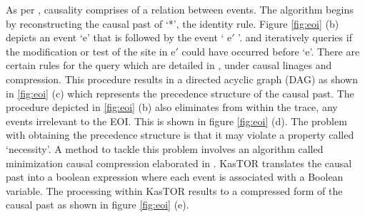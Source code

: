 \documentclass[msc,deptreport,ai]{infthesis}      %
\begin{document}
As per \cite{kappaPlatform}, causality comprises of a relation between events. The algorithm begins by reconstructing the causal past of `*', the identity rule. Figure \ref{fig:eoi} (b) depicts an event `e' that is followed by the event ` e$'$ '. and iteratively queries if the modification or test of the site in e$'$  could have occurred before `e'. There are certain rules for the query which are detailed in \cite{kappaPlatform}, under causal linages and compression. This procedure results in a directed acyclic graph (DAG) as shown in \ref{fig:eoi} (c) which represents the precedence structure of the causal past. The procedure depicted in \ref{fig:eoi} (b) also eliminates from within the trace, any events irrelevant to the EOI. This is shown in figure \ref{fig:eoi} (d). The problem with obtaining the precedence structure is that it may violate a property called `necessity'. A method to tackle this problem involves an algorithm called minimization causal compression elaborated in \cite{danos2012graphs}. KasTOR translates the causal past into a boolean expression where each event is associated with a Boolean variable. The processing within KasTOR results to a compressed form of the causal past as shown in figure \ref{fig:eoi} (e).
\end{document}
